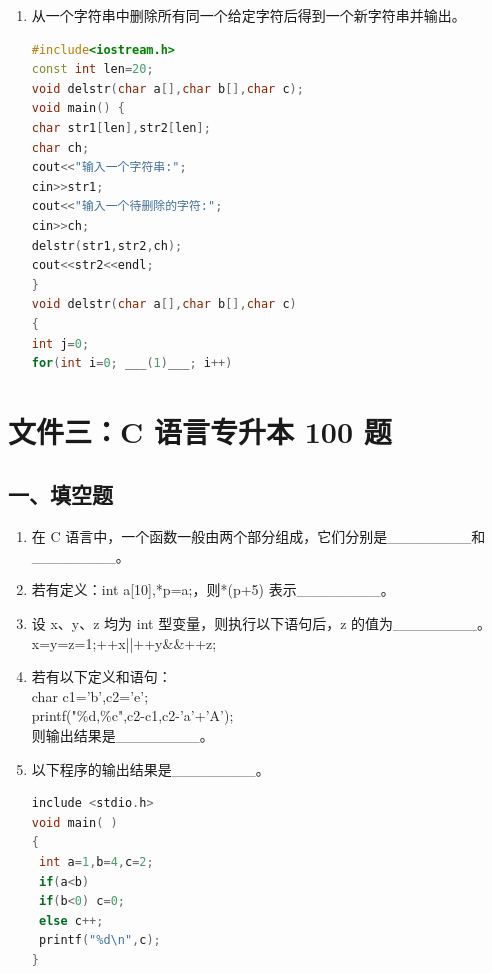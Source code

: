 \documentclass[a4paper,12pt]{article}
\begin{document}
\begin{enumerate}
    \item 从一个字符串中删除所有同一个给定字符后得到一个新字符串并输出。
    \begin{lstlisting}[language=C++]
#include<iostream.h>
const int len=20;
void delstr(char a[],char b[],char c);
void main() {
char str1[len],str2[len];
char ch;
cout<<"输入一个字符串:";
cin>>str1;
cout<<"输入一个待删除的字符:"; 
cin>>ch;
delstr(str1,str2,ch);
cout<<str2<<endl;
}
void delstr(char a[],char b[],char c)
{
int j=0;
for(int i=0; ___(1)___; i++)
    \end{lstlisting}
\end{enumerate}

\section{文件三：C 语言专升本 100 题}

\subsection{一、填空题}
\begin{enumerate}
    \item 在 C 语言中，一个函数一般由两个部分组成，它们分别是\_\_\_\_\_\_\_\_和\_\_\_\_\_\_\_\_。
    \item 若有定义：int a[10],*p=a;，则*(p+5) 表示\_\_\_\_\_\_\_\_。
    \item 设 x、y、z 均为 int 型变量，则执行以下语句后，z 的值为\_\_\_\_\_\_\_\_。\\
    x=y=z=1;++x||++y\&\&++z;
    \item 若有以下定义和语句：\\
    char c1='b',c2='e';\\
    printf("\%d,\%c\n",c2-c1,c2-'a'+'A');\\
    则输出结果是\_\_\_\_\_\_\_\_。
    \item 以下程序的输出结果是\_\_\_\_\_\_\_\_。
    \begin{lstlisting}[language=C]
include <stdio.h>
void main( )
{
 int a=1,b=4,c=2;
 if(a<b)
 if(b<0) c=0;
 else c++;
 printf("%d\n",c);
}
    \end{lstlisting}
\end{enumerate}
\end{document}
